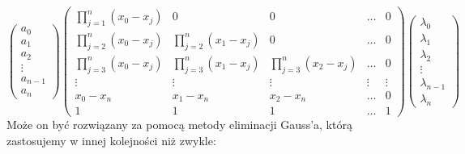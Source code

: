 \documentclass[11pt, wide]{article}
\begin{document}
\begin{equation}
    \left(\begin{array}{c}
        a_0\\
        a_1\\
        a_2\\
        \vdots\\
        a_{n-1}\\
        a_n
    \end{array}\right)
    \left(\begin{array}{ccccc}
        \prod_{j=1}^{n}(x_0 - x_j) & 0 & 0 & \ldots & 0\\
        \prod_{j=2}^{n}(x_0 - x_j) & \prod_{j=2}^{n}(x_1 - x_j) & 0 & \ldots & 0\\
        \prod_{j=3}^{n}(x_0 - x_j) & \prod_{j=3}^{n}(x_1 - x_j) & \prod_{j=3}^{n}(x_2 - x_j) & \ldots & 0\\
        \vdots & \vdots & \vdots & \vdots & \vdots\\
        x_0 - x_n & x_1 - x_n & x_2 - x_n & \ldots & 0\\
        1 & 1 & 1 & \ldots & 1
    \end{array}\right)
    \left(\begin{array}{c}
        \lambda_0\\
        \lambda_1\\
        \lambda_2\\
        \vdots\\
        \lambda_{n-1}\\
        \lambda_n
    \end{array}\right)
\end{equation} 
Może on być rozwiązany za pomocą metody eliminacji Gauss'a, którą zastosujemy w 
innej kolejności niż zwykle:
\end{document}
